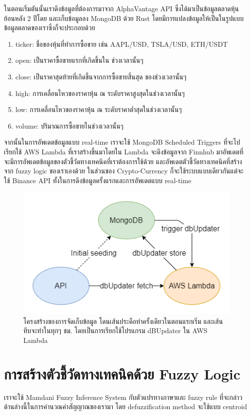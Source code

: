ในตอนเริ่มตันนั้นเราดึงข้อมูลที่ต้องการมาจาก AlphaVantage API ซึ่งได้มาเป็นข้อมูลตลาดหุ้นย้อนหลัง 2 ปีโดย
และเก็บข้อมูลลง MongoDB ด้วย Rust โดยมีการแปลงข้อมูลให้เป็นในรูปแบบข้อมูลตลาดของเราซึ่งก็จะประกอบด้วย
\begin{enumerate}
    \item ticker: ชื่อของหุ้นที่ทำการซื้อขาย เช่น AAPL/USD, TSLA/USD, ETH/USDT
    \item open: เป็นราคาซื้อขายแรกที่เกิดขึ้นใน ช่วงเวลานั้นๆ
    \item close: เป็นราคาสุดท้ายที่เกิดขึ้นจากการซื้อขายสิ้นสุด ของช่วงเวลานั้นๆ
    \item high: การเคลื่อนไหวของราคาหุ้น ณ ระดับราคาสูงสุดในช่วงเวลานั้นๆ
    \item low: การเคลื่อนไหวของราคาหุ้น ณ ระดับราคาต่ำสุดในช่วงเวลานั้นๆ
    \item volume: ปริมาณการซื้อขายในช่วงเวลานั้นๆ
\end{enumerate}
จากนั้นในการอัพเดตข้อมูลแบบ real-time เราจะใช้ MongoDB Scheduled Triggers ที่จะไปเรียกใช้ AWS Lambda ที่เราสร้างขึ้นมาโดยใน Lambda จะดึงข้อมูลจาก 
Finnhub มาอัพเดตที่จะมีการอัพเดตข้อมูลของตัวชี้วัดทางเทคนิคที่เราต้องการใช้ด้วย และอัพเดตตัวชี้วัดทางเทคนิคที่สร้างจาก fuzzy logic ของเราเองด้วย
ในส่วนของ Crypto-Currency ก็จะใช้ระบบแบบเดียวกันแต่จะใช้ Binance API ทั้งในการดึงข้อมูลครั้งแรกและการอัพเดตแบบ real-time

\begin{figure}[ht]
    \centering
    \includegraphics[scale=0.6]{images/db.png}
    \caption{โครงสร้างของการจัดเก็บข้อมูล โดนเส้นประคือทำครั้งเดียวในตอนแรกเริ่ม และเส้นทึบจะทำในทุกๆ ชม. โดยเป็นการเรียกใช้โปรแกรม dBUpdater ใน AWS Lambda}
    \label{fig:7}
\end{figure}
\FloatBarrier

\section{การสร้างตัวชี้วัดทางเทคนิคด้วย Fuzzy Logic}
เราจะใช้ Mamdani Fuzzy Inference System กับตัวแปรทางภาษาและ fuzzy rule ที่จะกล่าวด้านล่างนี้ในการคำนวณค่าสัญญาณของเรามา โดย defuzzification method จะใช้แบบ
centroid 

